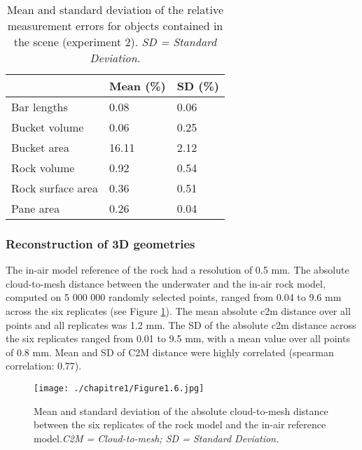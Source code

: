 \begin{table}[htbp]
  \centering
  \normalsize
  \caption[Mean and standard deviation of the relative measurement errors for objects contained in the scene]{Mean and standard deviation of the relative measurement errors for objects contained in the scene (experiment 2). \textit{SD = Standard Deviation.}}
  \label{table1.6}
  
\begin{tabular}{L{4cm} C{2cm}C{2cm}}
        \toprule
                          & \textbf{Mean (\%)} & \textbf{SD (\%)} \\ \midrule
        Bar lengths       & 0.08               & 0.06             \\
        Bucket volume     & 0.06               & 0.25             \\
        Bucket area       & 16.11              & 2.12             \\
        Rock volume       & 0.92               & 0.54             \\
        Rock surface area & 0.36               & 0.51             \\
        Pane area         & 0.26               & 0.04             \\ \bottomrule
    \end{tabular}
\end{table}

\subsubsection{Reconstruction of 3D geometries}\label{chapitre1_3.2.3}
The in-air model reference of the rock had a resolution of 0.5 mm. The absolute cloud-to-mesh distance between the underwater and the in-air rock model, computed on 5 000 000 randomly selected points, ranged from 0.04 to 9.6 mm across the six replicates (see Figure \ref{figure1.6}). The mean absolute \acrshort{c2m} distance over all points and all replicates was 1.2 mm. The SD of the absolute \acrshort{c2m} distance across the six replicates ranged from 0.01 to 9.5 mm, with a mean value over all points of 0.8 mm. Mean and SD of C2M distance were highly correlated (spearman correlation: 0.77).

\begin{figure}[htbp]
	\texttt{[image: ./chapitre1/Figure1.6.jpg]}
	\caption[Mean and standard deviation of the absolute cloud-to-mesh distance between the six replicates of the rock model and the in-air reference model.]{Mean and standard deviation of the absolute cloud-to-mesh distance between the six replicates of the rock model and the in-air reference model.\textit{C2M = Cloud-to-mesh; SD = Standard Deviation.}}
	\label{figure1.6}
\end{figure}


